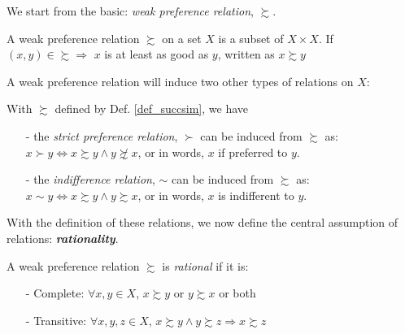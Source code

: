 We start from the basic: \textit{weak preference relation}, $\succsim$.
\begin{definition}\label{def_succsim}
    A weak preference relation $\succsim$ on a set $X$ is a subset of $X\times X$. If $(x,y)\in \succsim \Rightarrow$ $x$ is at least as good as $y$, written as $x\succsim y$
\end{definition}

A weak preference relation will induce two other types of relations on $X$:
\begin{definition}\label{def_succ_and_sim}
    With $\succsim$ defined by Def. \ref{def_succsim}, we have
    \begin{enumerate}
        \item[-] the \textit{strict preference relation}, $\succ$ can be induced from $\succsim$ as: $x\succ y\Leftrightarrow x\succsim y \land y\not\succsim x$,
        or in words, $x$ if preferred to $y$.
        \item[-] the \textit{indifference relation}, $\sim$ can be induced from $\succsim$ as: $x\sim y \Leftrightarrow x\succsim y \land y\succsim x$, or in words, $x$ is indifferent to $y$.
    \end{enumerate}
\end{definition}

With the definition of these relations, we now define the central assumption of relations: \textit{\textbf{rationality}}. 
\begin{definition}\label{def_succsim_rational}
    A weak preference relation $\succsim$ is \textit{rational} if it is:
    \begin{enumerate}
        \item[-] Complete: $\forall x,y\in X$, $x\succsim y$ or $y\succsim x$ or both 
        \item[-] Transitive: $\forall x,y,z\in X$, $x\succsim y\land y\succsim z\Rightarrow x\succsim z$
    \end{enumerate}
\end{definition}

